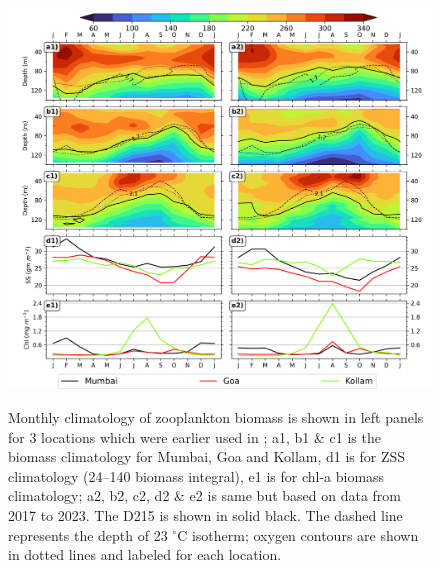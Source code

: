 \documentclass[authoryear,review,12pt]{elsarticle}
\newcounter{myfig} %
\begin{document}
\begin{figure}[htbp]
	\centering
	\includegraphics[width=\textwidth]{./figures/aparna_ranjan_climatology_comparison.png} 
	\captionsetup{justification=justified,font=footnotesize,skip=0.05\baselineskip,width=\textwidth}
	\caption{Monthly climatology of zooplankton biomass is shown in left panels for 3 locations which were earlier used in \citep{aparna2022seasonal}; a1, b1 \& c1 is the biomass climatology for Mumbai, Goa and Kollam, d1 is for ZSS climatology (24--140 biomass integral), e1 is for chl-a biomass climatology; a2, b2, c2, d2 \& e2 is same but based on data from 2017 to 2023. The D215 is shown in solid black. The dashed line represents the depth of 23 $^\circ$C isotherm; oxygen contours are shown in dotted lines and labeled for each location.}
	\label{fig:zsschlclimcomp}
	\label{myfig:a}
\end{figure}
\end{document}
